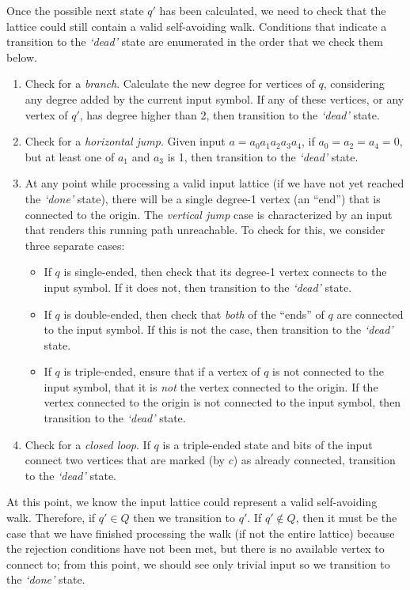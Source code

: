 Once the possible next state $q'$ has been calculated, we need to check that the lattice could still contain a valid self-avoiding walk. Conditions that indicate a transition to the \emph{`dead'} state are enumerated in the order that we check them below.
\begin{enumerate}
\item Check for a \emph{branch}. Calculate the new degree for vertices of $q$, considering any degree added by the current input symbol. If any of these vertices, or any vertex of $q'$, has degree higher than 2, then transition to the \emph{`dead'} state.
\item Check for a \emph{horizontal jump}. Given input $a=a_0a_1a_2a_3a_4$, if $a_0 = a_2 = a_4 = 0$, but at least one of $a_1$ and $a_3$ is 1, then transition to the \emph{`dead'} state.
\item At any point while processing a valid input lattice (if we have not yet reached the \emph{`done'} state), there will be a single degree-1 vertex (an ``end'') that is connected to the origin. The \emph{vertical jump} case is characterized by an input that renders this running path unreachable. To check for this, we consider three separate cases:
\begin{itemize}
\item If $q$ is single-ended, then check that its degree-1 vertex connects to the input symbol. If it does not, then transition to the \emph{`dead'} state. 
\item If $q$ is double-ended, then check that \emph{both} of the ``ends'' of $q$ are connected to the input symbol. If this is not the case, then transition to the \emph{`dead'} state.
\item If $q$ is triple-ended, ensure that if a vertex of $q$ is not connected to the input symbol, that it is \emph{not} the vertex connected to the origin. If the vertex connected to the origin is not connected to the input symbol, then transition to the \emph{`dead'} state.
\end{itemize}
\item Check for a \emph{closed loop}. If $q$ is a triple-ended state and bits of the input connect two vertices that are marked (by $c$) as already connected, transition to the \emph{`dead'} state.
\end{enumerate}

At this point, we know the input lattice could represent a valid self-avoiding walk. Therefore, if $q'\in Q$ then we transition to $q'$. If $q'\notin Q$, then it must be the case that we have finished processing the walk (if not the entire lattice) because the rejection conditions have not been met, but there is no available vertex to connect to; from this point, we should see only trivial input so we transition to the \emph{`done'} state.
